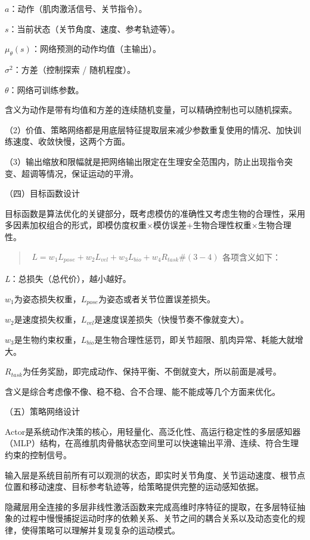 \(a\)：动作（肌肉激活信号、关节指令）。

\(s\)：当前状态（关节角度、速度、参考轨迹等）。

\(\mu_{\theta}(s)\)：网络预测的动作均值（主输出）。

\(\sigma^{2}\)：方差（控制探索 / 随机程度）。

\(\theta\)：网络可训练参数。

含义为动作是带有均值和方差的连续随机变量，可以精确控制也可以随机探索。

（2）价值、策略网络都是用底层特征提取层来减少参数重复使用的情况、加快训练速度、收敛快慢，这两个方面。

（3）输出缩放和限幅就是把网络输出限定在生理安全范围内，防止出现指令突变、超调等情况，保证运动的平滑。

（四）目标函数设计

目标函数是算法优化的关键部分，既考虑模仿的准确性又考虑生物的合理性，采用多因素加权组合的形式，即模仿度权重×模仿误差+生物合理性权重×生物合理性。

\begin{quote}
\(\begin{array}{r}
L = w_{1}L_{pose} + w_{2}L_{vel} + w_{3}L_{bio} + w_{4}R_{task}\#(3 - 4)
\end{array}\)各项含义如下：
\end{quote}

\emph{L}：总损失（总代价），越小越好。

\(w_{1}\)为姿态损失权重，\(L_{pose}\)为姿态或者关节位置误差损失。

\(w_{2}\)是速度损失权重，\(L_{vel}\)是速度误差损失（快慢节奏不像就变大）。

\(w_{3}\)是生物约束权重，\(L_{bio}\)是生物合理性惩罚，即关节超限、肌肉异常、耗能大就增大。

\(R_{task}\)为任务奖励，即完成动作、保持平衡、不倒就变大，所以前面是减号。

含义是综合考虑像不像、稳不稳、合不合理、能不能成等几个方面来优化。

（五）策略网络设计

Actor是系统动作决策的核心，用轻量化、高泛化性、高运行稳定性的多层感知器（MLP）结构，在高维肌肉骨骼状态空间里可以快速输出平滑、连续、符合生理约束的控制信号。

输入层是系统目前所有可以观测的状态，即实时关节角度、关节运动速度、根节点位置和移动速度、目标参考轨迹等，给策略提供完整的运动感知依据。

隐藏层用全连接的多层非线性激活函数来完成高维时序特征的提取，在多层特征抽象的过程中慢慢捕捉运动时序的依赖关系、关节之间的耦合关系以及动态变化的规律，使得策略可以理解并复现复杂的运动模式。

